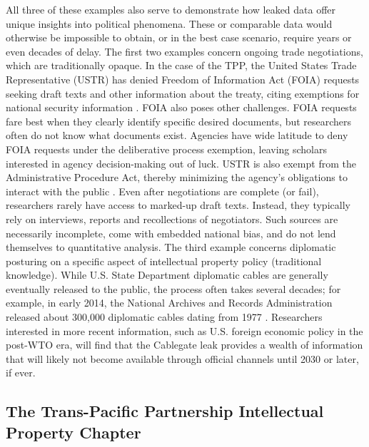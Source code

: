 \documentclass[12pt]{article}
\begin{document}
All three of these examples also serve to demonstrate how leaked data offer unique insights into 
political phenomena. These or comparable data would otherwise be impossible to obtain, or in the best case scenario, 
require years or even decades of delay. The first two examples concern ongoing trade negotiations, 
which are traditionally opaque. In the case of the TPP, the United States Trade Representative (USTR) has denied 
Freedom of Information Act (FOIA) requests seeking draft texts and other information about the treaty, citing exemptions 
for national security information \citep{levine2012bring}. FOIA also poses other challenges. FOIA requests 
fare best when they clearly identify specific desired documents, but researchers often do not know what documents exist. 
Agencies have wide latitude to deny FOIA requests under the deliberative process exemption, leaving scholars 
interested in agency decision-making out of luck.
USTR is also exempt from the Administrative Procedure Act, thereby minimizing 
the agency's obligations to interact with the public \citep{kaminski2014capture}.
Even after negotiations are complete (or fail), researchers rarely have 
access to marked-up draft texts. Instead, they typically rely on interviews, reports and recollections of 
negotiators.
Such sources are necessarily incomplete, come with embedded national bias, and do not lend themselves 
to quantitative analysis. The third example concerns diplomatic posturing on a specific aspect of 
intellectual property policy (traditional knowledge). While U.S. State Department diplomatic cables are generally eventually released to the public, the process often takes several decades; for example, in early 2014, the National Archives and Records Administration 
released about 300,000 diplomatic cables dating from 1977 \citep{national_security_archive2014u.s.}. 
Researchers interested in more recent information, 
such as U.S. foreign economic policy in the post-WTO era, will find that the Cablegate leak provides a wealth of 
information that will likely not become available through official channels until 2030 or later, if ever.

\subsection{The Trans-Pacific Partnership Intellectual Property Chapter}
\label{tpp_ip}

\end{document}
